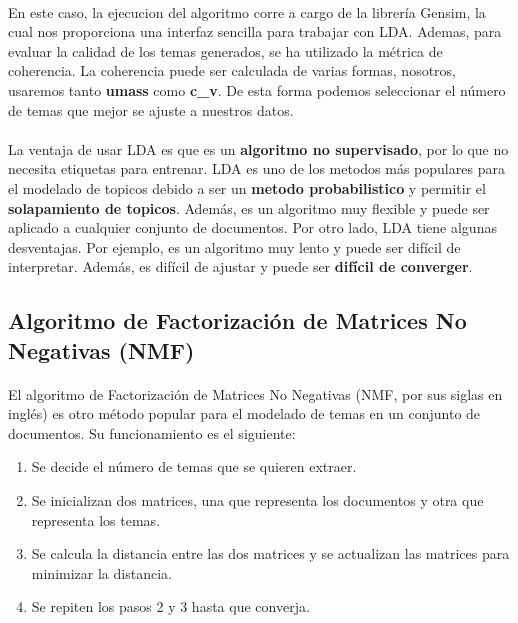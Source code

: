 \documentclass{report}
\begin{document}
                \paragraph*{}{
                    En este caso, la ejecucion del algoritmo corre a cargo de la librería Gensim, la cual nos proporciona una interfaz sencilla para trabajar con LDA.
                    Ademas, para evaluar la calidad de los temas generados, se ha utilizado la métrica de coherencia. 
                    La coherencia puede ser calculada de varias formas, nosotros, usaremos tanto \textbf{umass} como \textbf{c\_v}.
                    De esta forma podemos seleccionar el número de temas que mejor se ajuste a nuestros datos.
                }
                \paragraph*{}{
                    La ventaja de usar LDA es que es un \textbf{algoritmo no supervisado}, por lo que no necesita etiquetas para entrenar.
                    LDA es uno de los metodos más populares para el modelado de topicos debido a ser un \textbf{metodo probabilistico} y permitir el \textbf{solapamiento de topicos}. 
                    Además, es un algoritmo muy flexible y puede ser aplicado a cualquier conjunto de documentos.
                    Por otro lado, LDA tiene algunas desventajas. 
                    Por ejemplo, es un algoritmo muy lento y puede ser difícil de interpretar. 
                    Además, es difícil de ajustar y puede ser \textbf{difícil de converger}.
                }
            \subsection{Algoritmo de Factorización de Matrices No Negativas (NMF)}
                \paragraph*{}{
                    El algoritmo de Factorización de Matrices No Negativas (NMF, por sus siglas en inglés) es otro método popular para el modelado de temas en un conjunto de documentos.
                    Su funcionamiento es el siguiente:
                }
                \begin{enumerate}
                    \item Se decide el número de temas que se quieren extraer.
                    \item Se inicializan dos matrices, una que representa los documentos y otra que representa los temas.
                    \item Se calcula la distancia entre las dos matrices y se actualizan las matrices para minimizar la distancia.
                    \item Se repiten los pasos 2 y 3 hasta que converja.
                \end{enumerate}
\end{document}
